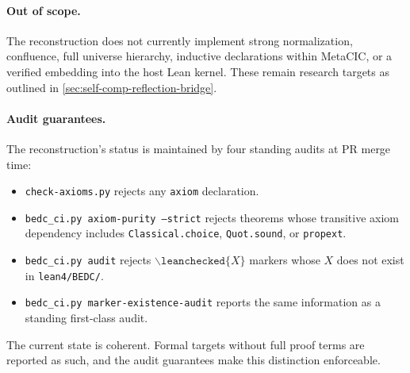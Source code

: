 \paragraph{Out of scope.} The reconstruction does not currently implement
strong normalization, confluence, full universe hierarchy, inductive
declarations within MetaCIC, or a verified embedding into the host Lean kernel.
These remain research targets as outlined in
\autoref{sec:self-comp-reflection-bridge}.

\paragraph{Audit guarantees.} The reconstruction's status is maintained by
four standing audits at PR merge time:
\begin{itemize}
  \item \texttt{check-axioms.py} rejects any \texttt{axiom} declaration.
  \item \texttt{bedc\_ci.py axiom-purity --strict} rejects theorems whose
    transitive axiom dependency includes \texttt{Classical.choice},
    \texttt{Quot.sound}, or \texttt{propext}.
  \item \texttt{bedc\_ci.py audit} rejects
    $\backslash\mathtt{leanchecked}\{X\}$ markers whose $X$ does not exist in
    \texttt{lean4/BEDC/}.
  \item \texttt{bedc\_ci.py marker-existence-audit} reports the same
    information as a standing first-class audit.
\end{itemize}
The current state is coherent. Formal targets without full proof terms are
reported as such, and the audit guarantees make this distinction enforceable.
